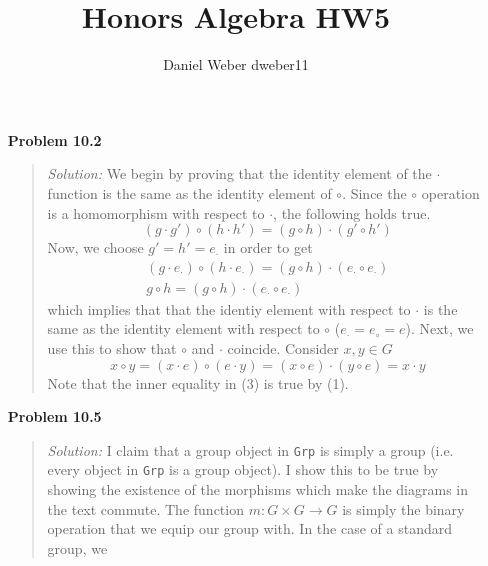 \documentclass{article}
\title{Honors Algebra HW5}
\author{Daniel Weber dweber11}
\newcommand{\Solution}{\textit{Solution: }}
\begin{document}
    \maketitle
    \begin{enumerate}
        \item[\textbf{Problem 10.2}]
            \begin{quote}
                \Solution We begin by proving that the identity element of the $\cdot$ function is the same as the identity element of $\circ$.
                Since the $\circ$ operation is a homomorphism with respect to $\cdot$, the following holds true.
                \begin{equation}
                    (g \cdot g') \circ (h \cdot h') = (g \circ h) \cdot (g' \circ h')
                \end{equation}
                Now, we choose $g' = h' = e_\cdot$ in order to get
                \begin{equation}
                    \begin{gathered}
                        (g \cdot e_\cdot) \circ (h \cdot e_\cdot) = (g \circ h) \cdot (e_\cdot \circ e_\cdot) \\
                        g \circ h = (g \circ h) \cdot (e_\cdot \circ e_\cdot)
                    \end{gathered}
                \end{equation}
                which implies that that the identiy element with respect to $\cdot$ is the same as the identity element with respect to $\circ$
                ($e_\cdot = e_\circ = e$).
                Next, we use this to show that $\circ$ and $\cdot$ coincide. Consider $x, y \in G$
                \begin{equation}
                    x \circ y = (x \cdot e) \circ (e \cdot y) = (x \circ e) \cdot (y \circ e) = x \cdot y
                \end{equation}
                Note that the inner equality in (3) is true by (1). \qedsymbol
            \end{quote} 
        \item[\textbf{Problem 10.5}]
            \begin{quote}
                \Solution I claim that a group object in {\tt Grp} is simply a group (i.e. every object in {\tt Grp} is a group object). 
                I show this to be true by showing the existence of the morphisms which make the diagrams in the text commute. The function
                $m:G \times G \to G$ is simply the binary operation that we equip our group with. In the case of a standard group, we 

\end{quote}
\end{enumerate}
\end{document}
